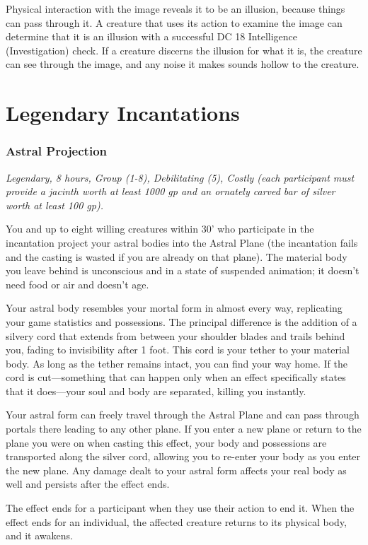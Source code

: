 Physical interaction with the image reveals it to be an illusion, because things can pass through it. A creature that uses its action to examine the image can determine that it is an illusion with a successful DC 18 Intelligence (Investigation) check. If a creature discerns the illusion for what it is, the creature can see through the image, and any noise it makes sounds hollow to the creature.

\section{Legendary Incantations}
\subsubsection{Astral Projection}
\textit{Legendary, 8 hours, Group (1-8), Debilitating (5), Costly (each participant must provide a jacinth worth at least 1000 gp and an ornately carved bar of silver worth at least 100 gp).}

You and up to eight willing creatures within 30' who participate in the incantation project your astral bodies into the Astral Plane (the incantation fails and the casting is wasted if you are already on that plane). The material body you leave behind is unconscious and in a state of suspended animation; it doesn't need food or air and doesn't age.

Your astral body resembles your mortal form in almost every way, replicating your game statistics and possessions. The principal difference is the addition of a silvery cord that extends from between your shoulder blades and trails behind you, fading to invisibility after 1 foot. This cord is your tether to your material body. As long as the tether remains intact, you can find your way home. If the cord is cut—something that can happen only when an effect specifically states that it does—your soul and body are separated, killing you instantly.

Your astral form can freely travel through the Astral Plane and can pass through portals there leading to any other plane. If you enter a new plane or return to the plane you were on when casting this effect, your body and possessions are transported along the silver cord, allowing you to re-enter your body as you enter the new plane. Any damage dealt to your astral form affects your real body as well and persists after the effect ends.

The effect ends for a participant when they use their action to end it. When the effect ends for an individual, the affected creature returns to its physical body, and it awakens.

